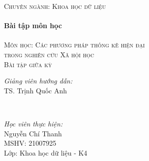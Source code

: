 \documentclass[14pt, a4paper]{article}
\theoremstyle{sltheorem}
\theoremstyle{soltheorem}
\begin{document}
\begin{titlepage}
    \textsc{\Large Chuyên ngành: Khoa học dữ liệu}\\[0.5cm] %



    \HRule \\[0.4cm]
    { \huge \bfseries Bài tập môn học}\\[0.4cm] %
    \HRule \\[1.5cm]

    \textsc{\Large Môn học: Các phương pháp thống kê hiện đại \\ trong nghiên cứu Xã hội học}\\[1cm] %


    \textsc{\Large Bài tập giữa kỳ}\\[1cm]


    \begin{minipage}{0.4\textwidth}
        \begin{flushleft} \large
        \emph{Giảng viên hướng dẫn:} \\
        TS. Trịnh Quốc Anh %
        \end{flushleft}
    \end{minipage}\\[0.5cm]

    \begin{minipage}{0.4\textwidth}
    \begin{flushleft} \large
    \emph{Học viên thực hiện:}\\
    Nguyễn Chí Thanh \\
    MSHV: 21007925 \\ %
    Lớp: Khoa học dữ liệu - K4
    \end{flushleft}
    \end{minipage}




\end{titlepage}
\end{document}
